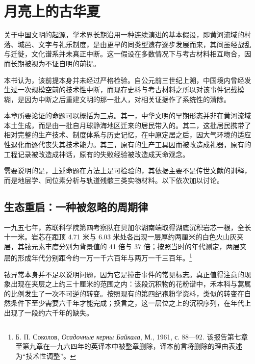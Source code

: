 \chapter{月亮上的古华夏}

\noindent
关于中国文明的起源，学术界长期沿用一种连续演进的基本假设，即黄河流域的村落、城邑、文字与礼乐制度，是由更早的同类型遗存逐步发展而来，其间虽经战乱与迁徙，文化谱系并未真正中断。这一假设在多数情况下与考古材料相互吻合，因而长期被视为不证自明的前提。

本书认为，该前提本身并未经过严格检验。自公元前三世纪上溯，中国境内曾经发生过一次规模空前的技术性中断，而现存史料与考古材料之所以对该事件记载模糊，是因为中断之后重建文明的那一批人，对相关证据作了系统性的清除。

本章所要论证的命题可以概括为三点。其一，中华文明的早期形态并非在黄河流域本土生成，而是由一批自月球静海地区迁来的居民带入的。其二，这批居民携带了相对完整的生产技术、制度体系与历史记忆，在中原定居之后，因大气环境的适应性退化而逐代丧失其技术能力。其三，原有的生产工具因而被改造成礼器，原有的工程记录被改造成神话，原有的失败经验被改造成天命观念。

需要说明的是，上述命题在方法上是可检验的，其依据主要不是传世文献的训释，而是地层学、同位素分析与轨道残骸三类实物材料。以下依次加以讨论。

\section{生态重启：一种被忽略的周期律}

一九五七年，苏联科学院第四考察队在贝加尔湖南端取得湖底沉积岩芯一根，全长十一米。岩芯在距顶 4.71 米与 6.03 米处各出现一层厚约两厘米的白色火山灰夹层，其铱元素丰度分别为背景值的 41 倍与 37 倍；按照当时的年代测定，两层夹层的形成年代分别距今约一万一千六百年与两万一千三百年。\footnote{Б. П. Соколов, \textit{Осадочные керны Байкала}, М., 1961, с. 88—92. 该报告第七章至第九章在一九六四年的英译本中被整章删除，译本前言将删除的理由表述为“技术性调整”。}

铱异常本身并不足以说明问题，因为它是撞击事件的常见标志。真正值得注意的现象出现在夹层之上约三十厘米的范围之内：该段沉积物的花粉谱中，禾本科与蒿属的比例发生了一次不可逆的转变。按照现有的第四纪孢粉学资料，类似的转变在自然条件下至少需要六千年才能完成；换言之，这一层位之上的沉积序列，在年代上出现了一段约六千年的缺失。

